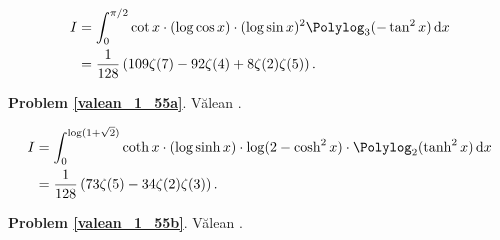%

\begin{problem_with_solution}
    \label{valean_1_55a}%
    \begin{align}
        I & = \int_0^{\pi/2} \cot x \cdot (\log \cos x) \cdot (\log \sin x)^2 \Polylog_3 (-\tan^2 x) \,\mathrm{d}x \\
        & = \frac{1}{128} \left(109 \zeta(7) - 92 \zeta(4) + 8 \zeta (2) \zeta(5) \right).
    \end{align}
\end{problem_with_solution}


\textbf{Problem \ref{valean_1_55a}}.
Vălean \cite[s. 35]{nahin15}.


\begin{problem_with_solution}
    \label{valean_1_55b}%
    \begin{align}
        I & = \int_0^{\log (1 + \sqrt 2)} \coth x \cdot (\log \sinh x) \cdot \log (2 - \cosh^2 x) \cdot \Polylog_2 (\tanh^2 x) \,\mathrm{d}x \\
        & = \frac{1}{128} \left(73 \zeta(5) - 34 \zeta(2) \zeta(3) \right).
    \end{align}
\end{problem_with_solution}


\textbf{Problem \ref{valean_1_55b}}.
Vălean \cite[s. 35]{nahin15}.


%